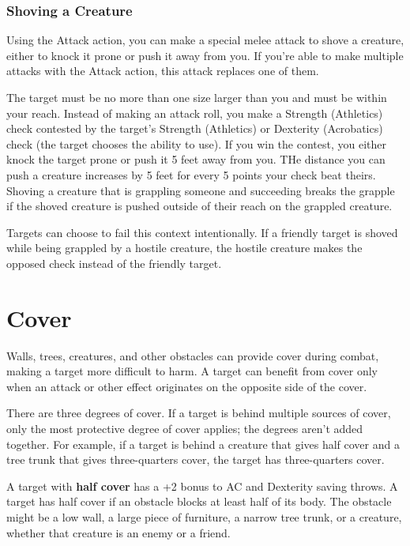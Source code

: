 \subsubsection{Shoving a Creature}

Using the Attack action, you can make a special melee attack to shove a creature, either to knock it prone or push it away from you. If you're able to make multiple attacks with the Attack action, this attack replaces one of them.

The target must be no more than one size larger than you and must be within your reach. Instead of making an attack roll, you make a Strength (Athletics) check contested by the target's Strength (Athletics) or Dexterity (Acrobatics) check (the target chooses the ability to use). If you win the contest, you either knock the target prone or push it 5 feet away from you. THe distance you can push a creature increases by 5 feet for every 5 points your check beat theirs. Shoving a creature that is grappling someone and succeeding breaks the grapple if the shoved creature is pushed outside of their reach on the grappled creature.

Targets can choose to fail this context intentionally. If a friendly target is shoved while being grappled by a hostile creature, the hostile creature makes the opposed check instead of the friendly target.

\section{Cover}

Walls, trees, creatures, and other obstacles can provide cover during combat, making a target more difficult to harm. A target can benefit from cover only when an attack or other effect originates on the opposite side of the cover.

There are three degrees of cover. If a target is behind multiple sources of cover, only the most protective degree of cover applies; the degrees aren't added together. For example, if a target is behind a creature that gives half cover and a tree trunk that gives three-quarters cover, the target has three-quarters cover.

A target with \textbf{half cover} has a +2 bonus to AC and Dexterity saving throws. A target has half cover if an obstacle blocks at least half of its body. The obstacle might be a low wall, a large piece of furniture, a narrow tree trunk, or a creature, whether that creature is an enemy or a friend.

